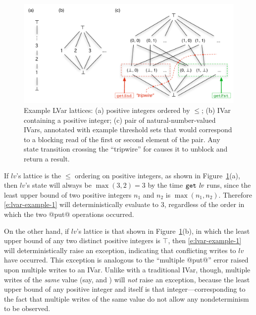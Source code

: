 \begin{figure}
\centering
\includegraphics[width=5in]{chapter2/figures/lvars-example-lattices.pdf} 
  \caption{Example LVar lattices: (a) positive integers ordered by
    $\leq$; (b) IVar containing a positive integer; (c) pair of
    natural-number-valued IVars, annotated with example threshold sets
    that would correspond to a blocking read of the first or second
    element of the pair.  Any state transition crossing the
    ``tripwire'' for  causes it to unblock and return
    a result.}
  \label{f:lvars-example-lattices}
\end{figure}

If $\mathit{lv}$'s lattice is the $\leq$ ordering on positive
integers, as shown in Figure~\ref{f:lvars-example-lattices}(a), then
$\mathit{lv}$'s state will always be $\max(3, 2) = 3$ by the time
$\mbox{\texttt{get}}~\mathit{lv}$ runs, since the least upper bound of two positive
integers $n_1$ and $n_2$ is $\max(n_1, n_2)$.  Therefore
\ref{e:lvar-example-1} will deterministically evaluate to $3$,
regardless of the order in which the two @put@ operations occurred.

On the other hand, if $\mathit{lv}$'s lattice is that shown in
Figure~\ref{f:lvars-example-lattices}(b), in which the least upper
bound of any two distinct positive integers is $\top$, then
\ref{e:lvar-example-1} will deterministically raise an exception,
indicating that conflicting writes to $\mathit{lv}$ have occurred.
This exception is analogous to the ``multiple @put@'' error raised
upon multiple writes to an IVar.  Unlike with a traditional IVar,
though, multiple writes of the \emph{same} value (say,
 and ) will \emph{not}
raise an exception, because the least upper bound of any positive
integer and itself is that integer---corresponding to the fact that
multiple writes of the same value do not allow any nondeterminism to
be observed.

